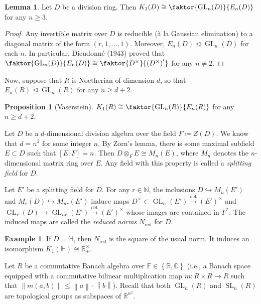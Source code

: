 \documentclass[10pt,letterpaper,cm]{nupset}
\theoremstyle{definition}
\newtheorem{exmp}[definition]{Example}
\theoremstyle{theorem}
\newtheorem{lemma}[definition]{Lemma}
\newtheorem{prop}[definition]{Proposition}
\theoremstyle{remark}
\newcommand{\C}{\mathbb C}
\renewcommand{\H}{\mathbb H}
\newcommand{\N}{\mathbb N}
\newcommand{\R}{\mathbb R}
\newcommand{\1}{\mathbf{1}}
\newcommand{\0}{\vec 0}
\DeclareMathOperator*{\GL}{GL}
\DeclareMathOperator*{\SL}{SL}
\DeclareMathOperator{\red}{red}
\begin{document}
\begin{lemma}
Let $D$ be a division ring. Then $K_1(D) \cong \faktor{\GL_n(D)}{E_n(D)}$ for any $n\geq 3$.
\end{lemma}
\begin{proof}
Any invertible matrix over $D$ is reducible (\`a la Gaussian elimination) to a diagonal matrix of the form $\left(r, 1, \ldots, 1\right)$. Moreover, $E_n(D)\unlhd \GL_n(D)$ for each $n$. In particular, Dieudonn\'e (1943) proved that  $\faktor{\GL_n(D)}{E_n(D)} \cong \faktor{D^{\times}}{\left(D^{\times}\right)'}$ for any $n\ne 2$. 
\end{proof}

\smallskip

Now, suppose that $R$ is Noetherian of dimension $d$, so that $E_n(R)\unlhd \GL_n(R)$ for any $n\geq d+2$. 

\begin{prop}[Vaserstein]
$K_1(R) \cong \faktor{\GL_n(R)}{E_n(R)}$ for any $n \geq d+2$. 
\end{prop}

\medskip


Let $D$ be a $d$-dimensional division algebra over the field $F\coloneqq Z(D)$. We know that $d =n^2$ for some integer $n$. By Zorn's lemma, there is some maximal subfield $E\subset D$ such that $\left[E : F\right] = n$. Then $D \otimes_F E \cong M_n(E)$, where $M_n$ denotes the $n$-dimensional matrix ring over $E$. Any field with this property is called a \textit{splitting field} for $D$.

Let $E'$ be a splitting field for $D$. For any $r \in \N$, the inclusions $D \hookrightarrow M_n(E')$ and $M_r(D) \hookrightarrow M_{nr}(E')$ induce maps $D^{\times}\subset \GL_n(E') \overset{\det}{\longrightarrow} (E')^{\times}$ and $\GL_r(D)\to \GL_{nr}(E')  \overset{\det}{\longrightarrow} (E')^{\times}$ whose images are contained in $F^{\ast}$. The induced maps are called the \textit{reduced norms} $N_{\red}$ for $D$.

\begin{exmp}
If $D = \H$, then $N_{\red}$ is the square of the usual norm. It induces an isomorphism $K_1(\H) \cong \R_+^{\times}$.
\end{exmp}

\medskip

Let $R$ be a commutative Banach algebra over $\mathbb{F} \in \left\{\R, \C\right\}$ (i.e., a Banach space equipped with a commutative bilinear multiplication map $m : R \times R \to R$ such that $\left\lVert{m(a,b)}\right\rVert \leq \left\lVert{a}\right\rVert\cdot \left\lVert{b}\right\rVert$). Recall that both $\GL_n(R)$ and $\SL_n(R)$ are topological groups as subspaces of $\R^{n^2}$. 
\end{document}

